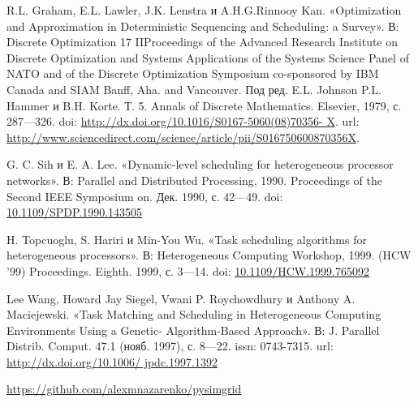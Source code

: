 \begin{thebibliography}{9}	
\large

 R.L. Graham, E.L. Lawler, J.K. Lenstra и A.H.G.Rinnooy Kan. «Optimization and Approximation in Deterministic Sequencing and Scheduling: a Survey». В: Discrete Optimization
17
IIProceedings of the Advanced Research Institute on Discrete Optimization and Systems Applications of the Systems Science Panel of NATO and of the Discrete Optimization Symposium co-sponsored by IBM Canada and SIAM Banff, Aha. and Vancouver. Под ред. E.L. Johnson P.L. Hammer и B.H. Korte. Т. 5. Annals of Discrete Mathematics. Elsevier, 1979, с. 287—326. doi: \url{http://dx.doi.org/10.1016/S0167-5060(08)70356- X}. url: \url{http://www.sciencedirect.com/science/article/pii/S016750600870356X}.


 G. C. Sih и E. A. Lee. «Dynamic-level scheduling for heterogeneous processor networks». В: Parallel and Distributed Processing, 1990. Proceedings of the Second IEEE Symposium on. Дек. 1990, с. 42—49. doi: \href{http://ieeexplore.ieee.org/document/143505/}{10.1109/SPDP.1990.143505}


 H. Topcuoglu, S. Hariri и Min-You Wu. «Task scheduling algorithms for heterogeneous processors». В: Heterogeneous Computing Workshop, 1999. (HCW ’99) Proceedings. Eighth. 1999, с. 3—14. doi: \href{http://ieeexplore.ieee.org/document/765092/}{10.1109/HCW.1999.765092}

 Lee Wang, Howard Jay Siegel, Vwani P. Roychowdhury и Anthony A. Maciejewski. «Task Matching and Scheduling in Heterogeneous Computing Environments Using a Genetic- Algorithm-Based Approach». В: J. Parallel Distrib. Comput. 47.1 (нояб. 1997), с. 8—22. issn: 0743-7315. url: \url{http://dx.doi.org/10.1006/ jpdc.1997.1392}

 \href{https://github.com/alexmnazarenko/pysimgrid}{https://github.com/alexmnazarenko/pysimgrid}


\end{thebibliography}